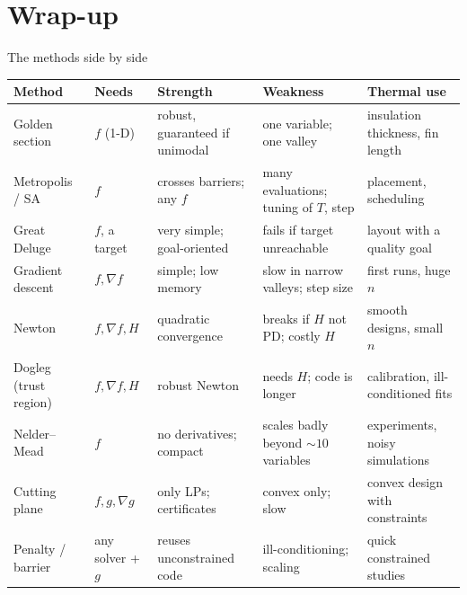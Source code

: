 \documentclass[aspectratio=169,10pt]{beamer}
\newcommand{\grad}{\nabla}
\begin{document}
\section{Wrap-up}

\begin{frame}{The methods side by side}
  \centering\scriptsize
  \begin{tabular}{p{2.5cm}p{2.4cm}p{3.4cm}p{3.6cm}p{2.5cm}}
    \toprule
    \textbf{Method} & \textbf{Needs} & \textbf{Strength} & \textbf{Weakness} & \textbf{Thermal use}\\
    \midrule
    Golden section & $f$ (1-D) & robust, guaranteed if unimodal & one variable; one valley & insulation thickness, fin length\\
    Metropolis / SA & $f$ & crosses barriers; any $f$ & many evaluations; tuning of $T$, step & placement, scheduling\\
    Great Deluge & $f$, a target & very simple; goal-oriented & fails if target unreachable & layout with a quality goal\\
    Gradient descent & $f,\grad f$ & simple; low memory & slow in narrow valleys; step size & first runs, huge $n$\\
    Newton & $f,\grad f,H$ & quadratic convergence & breaks if $H$ not PD; costly $H$ & smooth designs, small $n$\\
    Dogleg (trust region) & $f,\grad f,H$ & robust Newton & needs $H$; code is longer & calibration, ill-conditioned fits\\
    Nelder--Mead & $f$ & no derivatives; compact & scales badly beyond $\sim\!10$ variables & experiments, noisy simulations\\
    Cutting plane & $f,g,\grad g$ & only LPs; certificates & convex only; slow & convex design with constraints\\
    Penalty / barrier & any solver + $g$ & reuses unconstrained code & ill-conditioning; scaling & quick constrained studies\\
    \bottomrule
  \end{tabular}
\end{frame}
\end{document}

